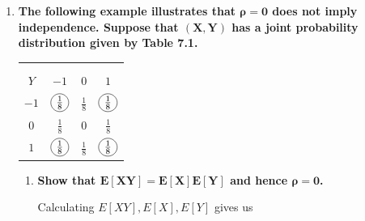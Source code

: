 \documentclass[10pt, oneside]{article}
\begin{document}
\begin{enumerate}[label=7.\arabic*]
Now we can calculate

\begin{align*}
E[X] &= \int^1_0 \frac{x}{e-2} (e^{1-x} - 1) \ dx \approx 0.3039 \\
E[Y] &= \int^1_0 \frac{y^2 e^{1-y}}{e-2} \ dy \approx 0.6078 \\
E[XY] &= k \int^1_0 \int^y_0 xye^{-y} \ dx \ dy \approx 0.2156 \\
V[X] &= \int^1_0 \frac{(x - E[X])^2}{e-2} (e^{1-x} - 1) \ dx \approx 0.0514 \\
V[Y] &= \int^1_0 (y - E[Y])^2 \frac{ye^{1-y}}{e - 2} \ dy \approx 0.0617
\end{align*}

Inputting the aforementioned calculations yields $\boxed{ \rho_{xy} = 0.5485 }$.

\item  \begin{tcolorbox}[
  colback=Cerulean!5!white,
  colframe=Cerulean!75!black]
  \textbf{The following example illustrates that $\bm{\rho = 0}$ does not imply independence. Suppose that $\bm{(X,Y)}$ has a joint probability distribution given by Table 7.1.}
  \end{tcolorbox}
  
  \begin{center}
\begin{tabular}{|c | c | c | c|} 
 \hline
  \diagbox{$X$\\}{\\$Y$} & $-1$ & $0$ & $1$ \\ 
 \hline\hline 
 $-1$ & $\mathcircled{\frac{1}{8}}$ & $\boxed{\frac{1}{8}}$ & $\mathcircled{\frac{1}{8}}$ \\ [1 ex] 
 \hline
 $0$ & $\boxed{\frac{1}{8}}$ & 0 & $\boxed{\frac{1}{8}}$ \\
 \hline
 $1$ & $\mathcircled{\frac{1}{8}}$ & $\boxed{\frac{1}{8}}$ & $\mathcircled{\frac{1}{8}}$ \\ 
 \hline
\end{tabular}
\end{center}

  
  	\begin{enumerate}
	\item  \begin{tcolorbox}[
	  colback=Cerulean!5!white,
	  colframe=Cerulean!75!black]
	  \textbf{Show that $\bm{E[XY] = E[X] E[Y]}$ and hence $\bm{\rho = 0}$.}
	  \end{tcolorbox}
	  
	  Calculating $E[XY], E[X], E[Y]$ gives us
	  

\end{enumerate}
\end{enumerate}
\end{document}

